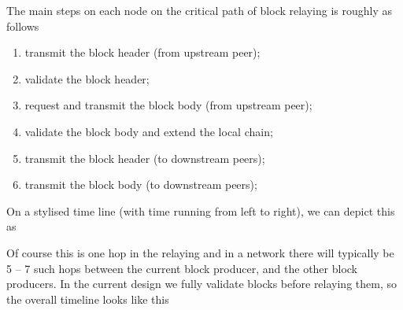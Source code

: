 \documentclass[11pt,a4paper]{article}
\begin{document}
The main steps on each node on the critical path of block relaying is roughly
as follows
\begin{enumerate}
\item transmit the block header (from upstream peer);
\item validate the block header;
\item request and transmit the block body (from upstream peer);
\item validate the block body and extend the local chain;
\item transmit the block header (to downstream peers);
\item transmit the block body (to downstream peers);
\end{enumerate}
On a stylised time line (with time running from left to right), we can depict
this as
\begin{center}
\end{center}
Of course this is one hop in the relaying and in a network there will typically
be 5 -- 7 such hops between the current block producer, and the other
block producers. In the current design we fully validate blocks before relaying
them, so the overall timeline looks like this
\end{document}
